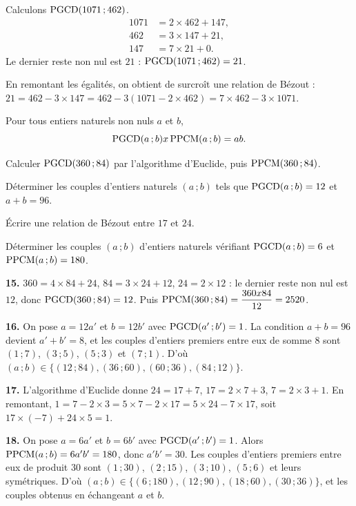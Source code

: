 \begin{exemple}
Calculons $\operatorname{PGCD}(1071\,;462)$.
\[
\begin{aligned}
  1071 &= 2\times462+147, \\
  462  &= 3\times147+21, \\
  147  &= 7\times21+0 .
\end{aligned}
\]
Le dernier reste non nul est $21$ : $\operatorname{PGCD}(1071\,;462) = 21$.

\smallskip
En remontant les égalités, on obtient de surcroît une relation de Bézout :
$21 = 462-3\times147 = 462-3(1071-2\times462) = 7\times462-3\times1071$.
\end{exemple}

\begin{propriete}
Pour tous entiers naturels non nuls $a$ et $b$,
\[
  \operatorname{PGCD}(a\,;b)x\operatorname{PPCM}(a\,;b) = ab .
\]
\end{propriete}

\begin{entrainement}
\exo[\niveau{1}] Calculer $\operatorname{PGCD}(360\,;84)$ par l'algorithme d'Euclide, puis
$\operatorname{PPCM}(360\,;84)$.

\exo[\niveau{2}] Déterminer les couples d'entiers naturels $(a\,;b)$ tels que
$\operatorname{PGCD}(a\,;b) = 12$ et $a+b = 96$.

\exo[\niveau{2}] Écrire une relation de Bézout entre $17$ et $24$.

\exo[\niveau{3}] Déterminer les couples $(a\,;b)$ d'entiers naturels vérifiant
$\operatorname{PGCD}(a\,;b) = 6$ et $\operatorname{PPCM}(a\,;b) = 180$.
\end{entrainement}

\begin{corrige}
\textbf{15.} $360 = 4\times84+24$, $84 = 3\times24+12$, $24 = 2\times12$ :
le dernier reste non nul est $12$, donc $\operatorname{PGCD}(360\,;84) = 12$. Puis
$\operatorname{PPCM}(360\,;84) = \dfrac{360x84}{12} = 2520$.

\textbf{16.} On pose $a = 12a'$ et $b = 12b'$ avec $\operatorname{PGCD}(a'\,;b') = 1$. La
condition $a+b = 96$ devient $a'+b' = 8$, et les couples d'entiers premiers
entre eux de somme $8$ sont $(1\,;7)$, $(3\,;5)$, $(5\,;3)$ et $(7\,;1)$.
D'où $(a\,;b) \in \{(12\,;84), (36\,;60), (60\,;36), (84\,;12)\}$.

\textbf{17.} L'algorithme d'Euclide donne $24 = 17+7$, $17 = 2\times7+3$,
$7 = 2\times3+1$. En remontant,
$1 = 7-2\times3 = 5\times7-2\times17 = 5\times24-7\times17$, soit
$17\times(-7)+24\times5 = 1$.

\textbf{18.} On pose $a = 6a'$ et $b = 6b'$ avec $\operatorname{PGCD}(a'\,;b') = 1$. Alors
$\operatorname{PPCM}(a\,;b) = 6a'b' = 180$, donc $a'b' = 30$. Les couples d'entiers premiers
entre eux de produit $30$ sont $(1\,;30)$, $(2\,;15)$, $(3\,;10)$, $(5\,;6)$
et leurs symétriques. D'où
$(a\,;b) \in \{(6\,;180), (12\,;90), (18\,;60), (30\,;36)\}$, et les couples
obtenus en échangeant $a$ et $b$.
\end{corrige}

